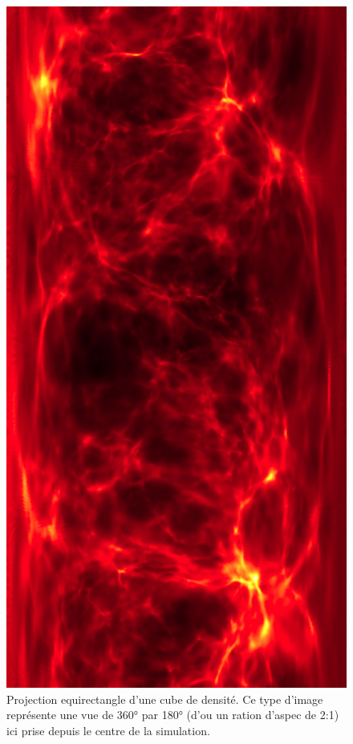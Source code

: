 
\begin{figure}[bth]
        \includegraphics[height=.95\textheight]{img/04/equi.png} 
        \caption{Projection equirectangle d'une cube de densité.
        Ce type d'image représente une vue de 360° par 180° (d'ou un ration d'aspec de 2:1) ici prise depuis le centre de la simulation.}
 		\label{fig:equirectangle}
\end{figure}


